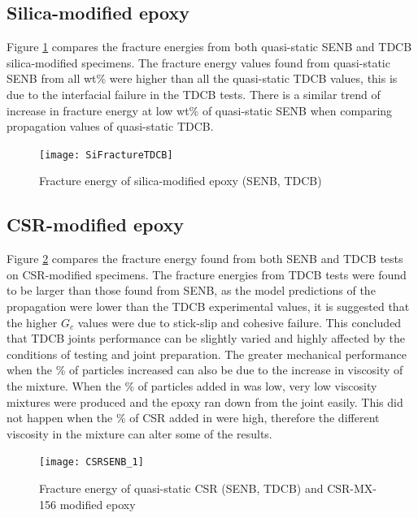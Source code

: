 \documentclass[numbers=noendperiod,chapterprefix=on]{icldt} %
\begin{document}
\subsection{Silica-modified epoxy}
Figure \ref{SiFractureTDCB} compares the fracture energies from both quasi-static SENB and TDCB silica-modified specimens. The fracture energy values found from quasi-static SENB from all wt\% were higher than all the quasi-static TDCB values, this is due to the interfacial failure in the TDCB tests.
There is a similar trend of increase in fracture energy at low wt\% of quasi-static SENB when comparing propagation values of quasi-static TDCB. 

\begin{figure}[!htpb]
\centering
\texttt{[image: SiFractureTDCB]}
\caption{Fracture energy of silica-modified epoxy (SENB, TDCB)} \label{SiFractureTDCB}
\end{figure}
\FloatBarrier

\subsection{CSR-modified epoxy}
Figure \ref{CSRSENB} compares the fracture energy found from both SENB and TDCB tests on CSR-modified specimens. The fracture energies from TDCB tests were found to be larger than those found from SENB, as the model predictions of the propagation were lower than the TDCB experimental values, it is suggested that the 
higher $ G_{c} $ values were due to stick-slip and cohesive failure. This concluded that TDCB joints performance can be slightly varied and highly affected by the conditions of testing and joint preparation. The greater mechanical performance when the \% of particles increased can also be due to the increase in viscosity of the mixture. When the \% of particles added in was low, very low viscosity mixtures were produced and the epoxy ran down from the joint easily. This did not happen when the \% of CSR added in were high, therefore the different viscosity in the mixture can alter some of the results.

\begin{figure}[!htpb]
\centering
\texttt{[image: CSRSENB\_1]}
\caption{Fracture energy of quasi-static CSR (SENB, TDCB) and CSR-MX-156 modified epoxy \cite{Giannakopoulos2011}}  \label{CSRSENB}
\end{figure}
\FloatBarrier
\end{document}
